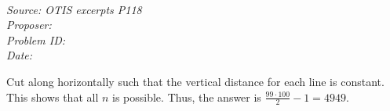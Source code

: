 \SSbreak\\
\emph{Source: OTIS excerpts P118}\\
\emph{Proposer: \Pchan}\\
\emph{Problem ID: }\\
\emph{Date: }\\
\SSbreak

\bigskip

\begin{solution}\hfil\medskip
  
    Cut along horizontally such that the vertical distance for each line is constant. This shows that all $n$ is possible. 
    Thus, the answer is $\frac{99\cdot 100}{2}-1 = 4949$.
\end{solution}\bigskip

